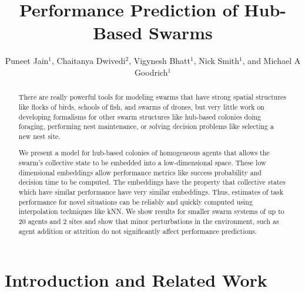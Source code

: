 \documentclass[openacc]{rsproca_new}%
\begin{document}
\title{Performance Prediction of Hub-Based Swarms}

\author{%
Puneet Jain$^{1}$, Chaitanya Dwivedi$^{2}$,
Vigynesh Bhatt$^{1}$, Nick Smith$^{1}$, and Michael A Goodrich$^{1}$ }

\address{$^{1}$Brigham Young University\\
$^{2}$Amazon AGI}

\subject{swarms, graph neural networks, performance prediction}



\begin{abstract}
There are really powerful tools for modeling swarms that have strong spatial structures like flocks of birds, schools of fish, and swarms of drones, but very little work on developing formalisms for other swarm structures like hub-based colonies doing foraging, performing nest maintenance, or solving decision problems like selecting a new nest site.

We present a model for hub-based colonies of homogeneous agents that allows the swarm's collective state to be embedded into a low-dimensional space. These low dimensional embeddings allow performance metrics like success probability and decision time to be computed.  The embeddings have the property that collective states which have similar performance have very similar embeddings. Thus, estimates of task performance for novel situations can be reliably and quickly computed using interpolation techniques like kNN. We show results for smaller swarm systems of up to 20 agents and 2 sites and show that minor perturbations in the environment, such as agent addition or attrition do not significantly affect performance predictions.
\end{abstract}

\rsbreak


\section{Introduction and Related Work}
\end{document}
